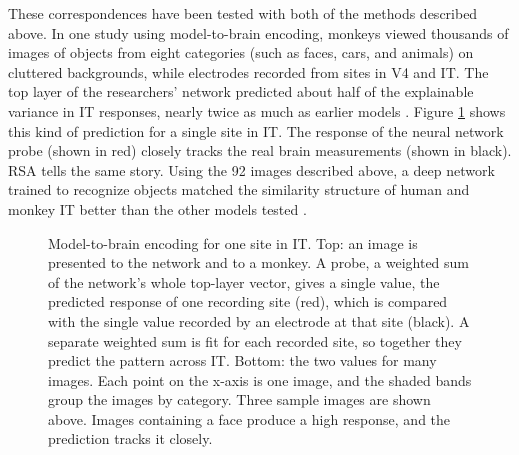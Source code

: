 These correspondences have been tested with both of the methods described above. In one study using model-to-brain encoding, monkeys viewed thousands of images of objects from eight categories (such as faces, cars, and animals) on cluttered backgrounds, while electrodes recorded from sites in V4 and IT. The top layer of the researchers' network predicted about half of the explainable variance in IT responses, nearly twice as much as earlier models \cite{yamins2014performance}. Figure \ref{yamins_2016_responses} shows this kind of prediction for a single site in IT. The response of the neural network probe (shown in red) closely tracks the real brain measurements (shown in black). RSA tells the same story. Using the 92 images described above, a deep network trained to recognize objects matched the similarity structure of human and monkey IT better than the other models tested \cite{khaligh2014deep}.

\begin{figure}[htbp]
\centering
{}
\caption[Bottom adapted from \cite{yamins2016using}, with a legend added. Top by Jeff Yoshimi.]{Model-to-brain encoding for one site in IT. Top: an image is presented to the network and to a monkey. A probe, a weighted sum of the network's whole top-layer vector, gives a single value, the predicted response of one recording site (red), which is compared with the single value recorded by an electrode at that site (black). A separate weighted sum is fit for each recorded site, so together they predict the pattern across IT. Bottom: the two values for many images. Each point on the x-axis is one image, and the shaded bands group the images by category. Three sample images are shown above. Images containing a face produce a high response, and the prediction tracks it closely.}
\label{yamins_2016_responses}
\end{figure}


